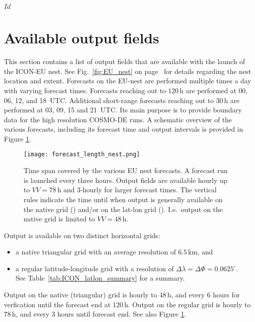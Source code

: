 \svnInfo $Id$


\section{Available output fields}\label{nest:sec_outfields}

This section contains a list of output fields that are available with
the launch of the ICON-EU nest. See Fig.~\ref{fig:EU_nest} on page~\pageref{fig:EU_nest} 
for details regarding the nest location and extent.
%
Forecasts on the EU-nest are performed multiple times a day with varying forecast times. Forecasts reaching out to $120\,\mathrm{h}$ 
are performed at 00, 06, 12, and 18~UTC. Additional short-range forecasts reaching out to $30\,\mathrm{h}$ are performed at 03, 09, 15 and 21~UTC. 
Its main purpose is to provide boundary data for the high resolution COSMO-DE runs. A schematic overview of the various forecasts, including its 
forecast time and output intervals is provided in Figure \ref{fig:forecast_length_nest}.
\begin{figure}[hbt]
 \centering
 \texttt{[image: forecast\_length\_nest.png]}
 \caption{Time span covered by the various EU nest forecasts. A forecast run is launched every three hours.
          Output fields are available hourly up to $VV=78\,\mathrm{h}$ and 3-hourly for larger forecast times. 
          The vertical rules indicate the time until when output is generally available on the native grid 
          (\protect\markRed) and/or on the lat-lon grid (\protect\markBlue). I.e.\ output on the native grid is 
          limited to $VV=48\,\mathrm{h}$.}\label{fig:forecast_length_nest}
\end{figure}

Output is available on two distinct horizontal grids: 
\begin{itemize}
  \item a native triangular grid with an average resolution of $6.5\,\mathrm{km}$, and
  \item a regular latitude-longitude grid with a resolution of $\Delta \lambda = \Delta \Phi=0.0625^{\circ}$.\\
    See Table~\ref{tab:ICON_latlon_summary} for a summary.
\end{itemize}
%
Output on the native (triangular) grid is hourly to $48\,\mathrm{h}$, and every $6$ hours for verfication
until the forecast end at $120\,\mathrm{h}$.
Output on the regular grid is hourly to $78\,\mathrm{h}$, and every $3$ hours
until forecast end. See also Figure \ref{fig:forecast_length_nest}.

